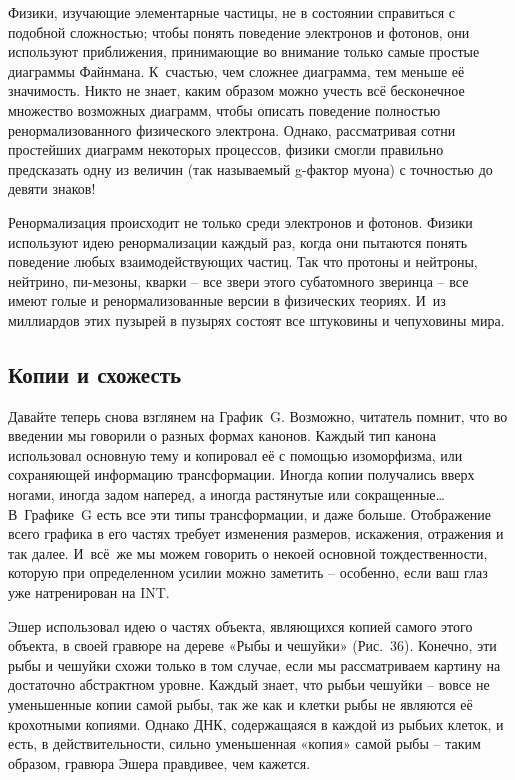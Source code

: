 \documentclass[../main.tex]{subfiles}
\begin{document}
Физики, изучающие элементарные частицы, не в состоянии справиться с подобной сложностью; чтобы понять поведение электронов и фотонов, они используют приближения, принимающие во внимание только самые простые диаграммы Файнмана. К~счастью, чем сложнее диаграмма, тем меньше её значимость. Никто не знает, каким образом можно учесть всё бесконечное множество возможных диаграмм, чтобы описать поведение полностью ренормализованного физического электрона. Однако, рассматривая сотни простейших диаграмм некоторых процессов, физики смогли правильно предсказать одну из величин (так называемый g-фактор муона) с точностью до девяти знаков!

Ренормализация происходит не только среди электронов и фотонов. Физики используют идею ренормализации каждый раз, когда они пытаются понять поведение любых взаимодействующих частиц. Так что протоны и нейтроны, нейтрино, пи-мезоны, кварки \--- все звери этого субатомного зверинца \--- все имеют голые и ренормализованные версии в физических теориях. И~из миллиардов этих пузырей в пузырях состоят все штуковины и чепуховины мира.


\subsection{Копии и схожесть}

Давайте теперь снова взглянем на График~G\@. Возможно, читатель помнит, что во введении мы говорили о разных формах канонов. Каждый тип канона использовал основную тему и копировал её с помощью изоморфизма, или сохраняющей информацию трансформации. Иногда копии получались вверх ногами, иногда задом наперед, а иногда растянутые или сокращенные\ldots{} В~Графике~G есть все эти типы трансформации, и даже больше. Отображение всего графика в его частях требует изменения размеров, искажения, отражения и так далее. И~всё~же мы можем говорить о некоей основной тождественности, которую при определенном усилии можно заметить \--- особенно, если ваш глаз уже натренирован на INT\@.

Эшер использовал идею о частях объекта, являющихся копией самого этого объекта, в своей гравюре на дереве «Рыбы и чешуйки» (Рис.~36). Конечно, эти рыбы и чешуйки схожи только в том случае, если мы рассматриваем картину на достаточно абстрактном уровне. Каждый знает, что рыбьи чешуйки \--- вовсе не уменьшенные копии самой рыбы, так же как и клетки рыбы не являются её крохотными копиями. Однако ДНК, содержащаяся в каждой из рыбьих клеток, и есть, в действительности, сильно уменьшенная «копия» самой рыбы \--- таким образом, гравюра Эшера правдивее, чем кажется.
\end{document}
